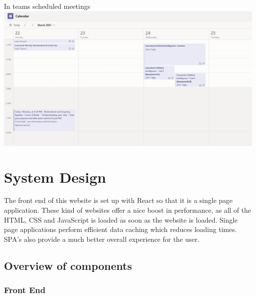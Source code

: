 In teams scheduled meetings \newline
\includegraphics[scale=0.4]{img/TCalendar.PNG}\newline

\chapter{System Design}
The front end of this website is set up with React so that it is a single page application. These kind of websites offer a nice boost in performance, as all of the HTML, CSS and JavaScript is loaded as soon as the website is loaded. Single page applications perform efficient data caching which reduces loading times. SPA's also provide a much better overall experience for the user.

\section{Overview of components}
\subsection{Front End}
